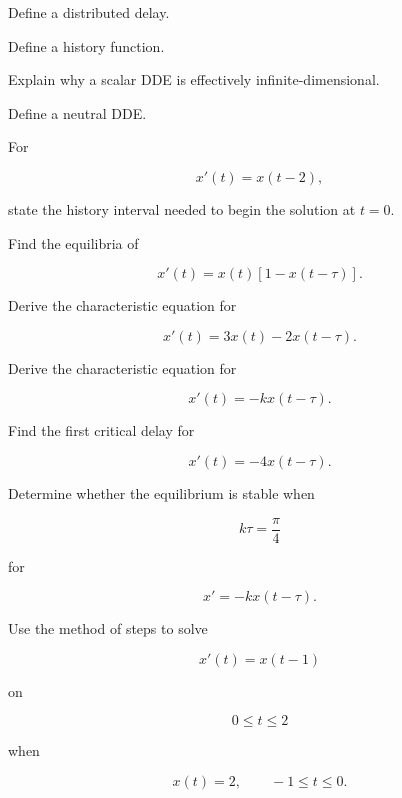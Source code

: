 \begin{exercise}[1]
Define a distributed delay.
\end{exercise}

\begin{exercise}[1]
Define a history function.
\end{exercise}

\begin{exercise}[1]
Explain why a scalar DDE is effectively infinite-dimensional.
\end{exercise}

\begin{exercise}[1]
Define a neutral DDE.
\end{exercise}

\begin{exercise}[2]
For

\[
x'(t)
=
x(t-2),
\]

state the history interval needed to begin the solution at \(t=0\).
\end{exercise}

\begin{exercise}[2]
Find the equilibria of

\[
x'(t)
=
x(t)
[
1-x(t-\tau)
].
\]
\end{exercise}

\begin{exercise}[2]
Derive the characteristic equation for

\[
x'(t)
=
3x(t)
-
2x(t-\tau).
\]
\end{exercise}

\begin{exercise}[2]
Derive the characteristic equation for

\[
x'(t)
=
-kx(t-\tau).
\]
\end{exercise}

\begin{exercise}[2]
Find the first critical delay for

\[
x'(t)
=
-4x(t-\tau).
\]
\end{exercise}

\begin{exercise}[2]
Determine whether the equilibrium is stable when

\[
k\tau=\frac{\pi}{4}
\]

for

\[
x'=-kx(t-\tau).
\]
\end{exercise}

\begin{exercise}[3]
Use the method of steps to solve

\[
x'(t)=x(t-1)
\]

on

\[
0\leq t\leq2
\]

when

\[
x(t)=2,
\qquad
-1\leq t\leq0.
\]
\end{exercise}

